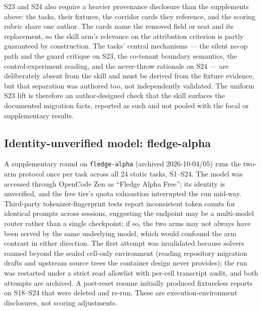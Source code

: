 \documentclass[11pt]{article}
\begin{document}
S23 and S24 also require a heavier provenance disclosure than the supplements above: the tasks, their fixtures, the corridor cards they reference, and the scoring rubric share one author. The cards name the removed field or seat and its replacement, so the skill arm's relevance on the attribution criterion is partly guaranteed by construction. The tasks' central mechanisms --- the silent no-op path and the guard critique on S23, the co-tenant boundary semantics, the control-experiment reading, and the never-throw rationale on S24 --- are deliberately absent from the skill and must be derived from the fixture evidence, but that separation was authored too, not independently validated. The uniform S23 lift is therefore an author-designed check that the skill surfaces the documented migration facts, reported as such and not pooled with the focal or supplementary results.

\subsection{Identity-unverified model: fledge-alpha}\label{app:fledge}

A supplementary round on \texttt{fledge-alpha} (archived 2026-10-04/05) runs the two-arm protocol once per task across all 24 static tasks, S1--S24. The model was accessed through OpenCode Zen as ``Fledge Alpha Free''; its identity is unverified, and the free tier's quota exhaustion interrupted the run mid-way. Third-party tokenizer-fingerprint tests report inconsistent token counts for identical prompts across sessions, suggesting the endpoint may be a multi-model router rather than a single checkpoint; if so, the two arms may not always have been served by the same underlying model, which would confound the arm contrast in either direction. The first attempt was invalidated because solvers roamed beyond the sealed cell-only environment (reading repository migration drafts and upstream source trees the container design never provides); the run was restarted under a strict read allowlist with per-cell transcript audit, and both attempts are archived. A post-reset resume initially produced fixtureless reports on S18--S24 that were deleted and re-run. These are execution-environment disclosures, not scoring adjustments.
\end{document}
